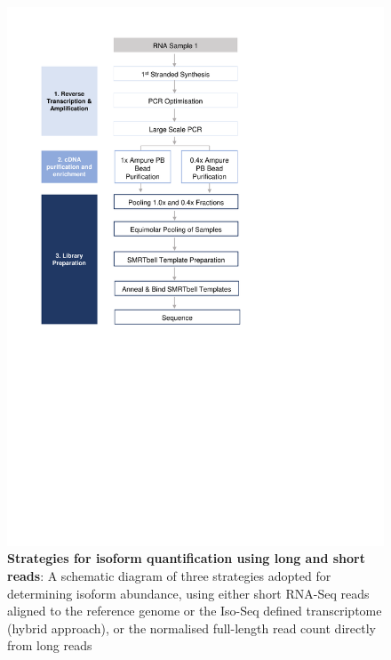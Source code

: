 \begin{figure}[htp]
	\begin{center}
		\includegraphics[page=8,trim={2cm 19cm 0 1cm},clip, scale = 0.8]{Figures/ProjectDevelopment_Figures.pdf}
	\end{center}
	\captionsetup{width=0.95\textwidth}
	\caption[Strategies for isoform quantification]%
	{\textbf{Strategies for isoform quantification using long and short reads}: A schematic diagram of three strategies adopted for determining isoform abundance, using either short RNA-Seq reads aligned to the reference genome or the Iso-Seq defined transcriptome (hybrid approach), or the normalised full-length read count directly from long reads}
	\label{fig:isoform_quant_strategy}
\end{figure}


